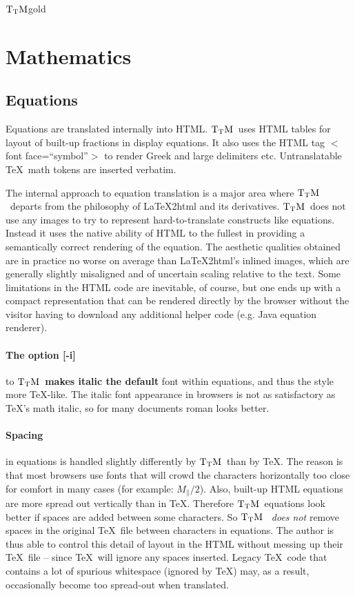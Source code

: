 \documentclass[12pt]{article}
\def\TtM{$\rm{}T_TH$}
\def\TtM{$\rm{}T_TM$}%
\def\TtMgold{\TtM{}gold}
\begin{document}
\ifx\TtMgold\undefined
\section{Mathematics}

\subsection{Equations}

 Equations are translated internally into HTML. \TtM\ uses HTML tables
 for layout of built-up fractions in display equations. It also uses
 the HTML tag $<$font face=``symbol''$>$ to render Greek and large
 delimiters etc. Untranslatable \TeX\ math tokens are inserted
 verbatim.

The internal approach to equation translation is a major area where
\TtM\ departs from the philosophy of \LaTeX2html and its
derivatives. \TtM\ 
does not use any images to try to represent hard-to-translate
constructs like equations.  Instead it uses the native ability of HTML
to the fullest in providing a semantically correct rendering of the
equation. The aesthetic qualities obtained are in practice no worse on
average than \LaTeX2html's inlined images, which are generally slightly
misaligned and of uncertain scaling relative to the text. Some
limitations in the HTML code are inevitable, of course, but one ends
up with a compact representation that can be rendered directly by the
browser without the visitor having to download any additional helper
code (e.g. Java equation renderer).

\paragraph{The option [-i]} to \TtM\ {\bf makes italic the default}
font within equations, and thus the style more \TeX-like. The italic
font appearance in browsers is not as satisfactory as \TeX's math
italic, so for many documents roman looks better.

\paragraph{Spacing} in equations is handled slightly differently by \TtM\ than
by \TeX. The reason is that most browsers use fonts that will crowd the
characters horizontally too close for comfort in many cases (for
example: $M_\parallel/2$). Also, built-up HTML equations are more
spread out vertically than in \TeX. Therefore \TtM\ equations look better
if spaces are added between some characters. So \TtM\ {\em
does not} remove spaces in the original \TeX\ file between characters in
equations. The author is thus able to control this detail of layout in
the HTML without messing up their \TeX\ file -- since \TeX\ will ignore
any spaces inserted. Legacy \TeX\ code that contains a lot of spurious
whitespace (ignored by \TeX) may, as a result, occasionally become too
spread-out when translated.
\end{document}
